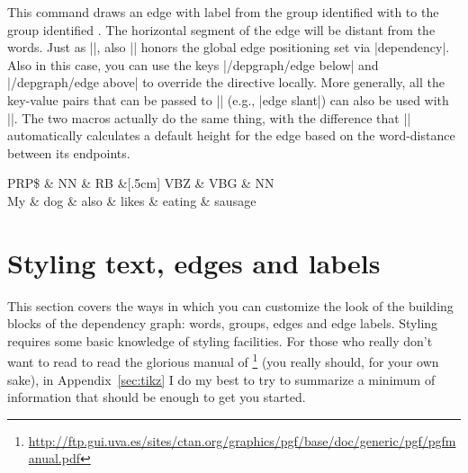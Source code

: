 \documentclass[a4paper]{ltxdoc}
\newcommand{\options}[1][key-value-pairs]{\opt{\oarg{#1}}}
\begin{document}
\begin{command}{\groupedge\options{}}

   This command draws an edge with label  from the group identified with  to the group identified . The horizontal segment of the edge will be  distant from the words. Just as |\depedge|, also |\groupedge| honors the global edge positioning set via |dependency|. Also in this case, you can use the keys |/depgraph/edge below| and |/depgraph/edge above| to override the directive locally. More generally, all the key-value pairs that can be passed to |\depedge| (e.g., |edge slant|) can also be used with |\groupedge|. The two macros actually do the same thing, with the difference that |\depedge| automatically calculates a default height for the edge based on the word-distance between its endpoints.
\begin{codeexample}[]
   \begin{dependency}
   \begin{deptext}[column sep=.5cm, row sep=.1ex]
      PRP\$ \& NN \& RB \&[.5cm] VBZ \& VBG \& NN \\
      My \& dog \& also \& likes \& eating \& sausage \\
   \end{deptext}
\end{dependency}
\end{codeexample}
\end{command}

\section{Styling text, edges and labels}\label{sec:styling}

This section covers the ways in which you can customize the look of the building blocks of the dependency graph: words, groups, edges and edge labels. Styling requires some basic knowledge of \tikzname{} styling facilities. For those who really don't want to read to read the glorious manual of \tikzname{}\footnote{\url{http://ftp.gui.uva.es/sites/ctan.org/graphics/pgf/base/doc/generic/pgf/pgfmanual.pdf}} (you really should, for your own sake), in Appendix~\ref{sec:tikz} I do my best to try to summarize a minimum of information that should be enough to get you started.
\end{document}

